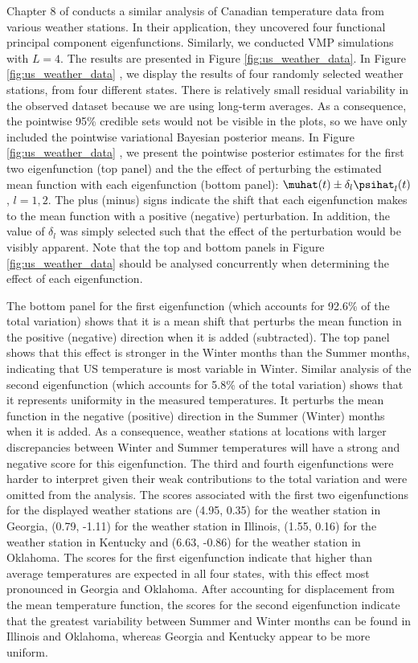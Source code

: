 \documentclass[ba]{imsart}
\numberwithin{equation}{section}
\theoremstyle{plain}
\begin{document}
Chapter 8 of \citet{ramsay05} conducts a similar analysis of Canadian temperature data from various weather
stations. In their application, they uncovered four functional principal component eigenfunctions.
Similarly, we conducted VMP simulations with $L = 4$.
The results are presented in Figure \ref{fig:us_weather_data}. In Figure \ref{fig:us_weather_data}
, we display the results of four randomly selected weather stations, from four different
states. There is relatively small residual variability in the observed dataset because we are using long-term averages.
As a consequence, the pointwise 95\% credible sets would not be visible in the plots,
so we have only included the pointwise variational Bayesian posterior means.
In Figure \ref{fig:us_weather_data} , we present the pointwise posterior estimates
for the first two eigenfunction (top panel) and the
the effect of perturbing the estimated mean function with each eigenfunction (bottom panel):
$\muhat (t) \pm \delta_l \psihat_l (t)$,
$l = 1, 2$. The plus (minus) signs indicate the shift that each eigenfunction makes to the mean function
with a positive (negative) perturbation. In addition, the value of $\delta_l$ was simply selected such that the effect
of the perturbation would be visibly apparent. Note that the top and bottom panels in Figure
\ref{fig:us_weather_data}  should be analysed concurrently when determining
the effect of each eigenfunction.

The bottom panel for the first eigenfunction (which accounts for 92.6\% of the total variation)
shows that it is a mean shift that perturbs the mean function in the positive
(negative) direction when it is added (subtracted). The top panel shows that this effect is stronger in the Winter months
than the Summer months, indicating that US temperature is most variable in Winter. Similar analysis of the
second eigenfunction (which accounts for 5.8\% of the total variation) shows that it represents uniformity in the measured
temperatures. It perturbs the mean function in the negative (positive) direction in the Summer (Winter) months when
it is added. As a consequence, weather stations at locations with larger discrepancies
between Winter and Summer temperatures will have a strong and negative score for this eigenfunction.
The third and fourth eigenfunctions were harder to interpret given their weak contributions to the
total variation and were omitted from the analysis.
The scores associated with the first two eigenfunctions for the displayed weather stations are
(4.95, 0.35) for the weather station in Georgia, (0.79, -1.11) for the weather station in Illinois, (1.55, 0.16)
for the weather station in Kentucky and (6.63, -0.86) for the weather station in Oklahoma.
The scores for the first eigenfunction indicate that higher than average temperatures are expected
in all four states, with this effect most pronounced in Georgia and Oklahoma.
After accounting for displacement from the mean temperature function, 
the scores for the second eigenfunction indicate that the
greatest variability between Summer and Winter months can be found
in Illinois and Oklahoma, whereas Georgia and Kentucky
appear to be more uniform.
\end{document}
